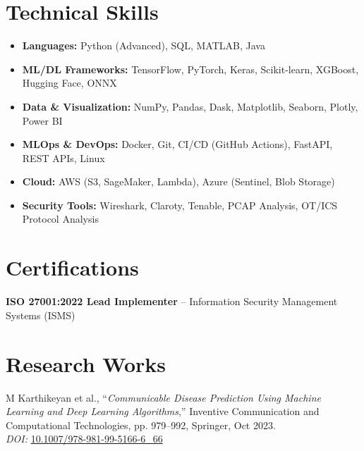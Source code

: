 \documentclass[11pt,letterpaper]{article}
\begin{document}
\section{Technical Skills}
\begin{itemize}
  \item \textbf{Languages:} Python (Advanced), SQL, MATLAB, Java
  \item \textbf{ML/DL Frameworks:} TensorFlow, PyTorch, Keras, Scikit-learn, XGBoost, Hugging Face, ONNX
  \item \textbf{Data \& Visualization:} NumPy, Pandas, Dask, Matplotlib, Seaborn, Plotly, Power BI
  \item \textbf{MLOps \& DevOps:} Docker, Git, CI/CD (GitHub Actions), FastAPI, REST APIs, Linux
  \item \textbf{Cloud:} AWS (S3, SageMaker, Lambda), Azure (Sentinel, Blob Storage)
  \item \textbf{Security Tools:} Wireshark, Claroty, Tenable, PCAP Analysis, OT/ICS Protocol Analysis
\end{itemize}

\section{Certifications}
\textbf{ISO 27001:2022 Lead Implementer} -- Information Security Management Systems (ISMS)

\section{Research Works}
M Karthikeyan et al., ``\textit{Communicable Disease Prediction Using Machine Learning and Deep Learning Algorithms},'' Inventive Communication and Computational Technologies, pp. 979--992, Springer, Oct 2023.\\
\textit{DOI:} \href{https://doi.org/10.1007/978-981-99-5166-6_66}{10.1007/978-981-99-5166-6\_66}
\end{document}
